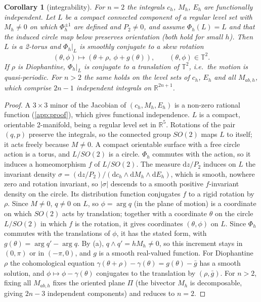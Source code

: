 \documentclass[11pt,a4paper]{article}
\newtheorem{corollary}[theorem]{Corollary}
\theoremstyle{definition}
\theoremstyle{remark}
\newcommand{\R}{\mathbb{R}}
\newcommand{\dd}{\mathrm{d}}
\begin{document}
\begin{corollary}[integrability]\label{cor:tori}
For $n=2$ the integrals $c_h$, $M_h$, $E_h$ are functionally independent. Let $L$ be a compact connected
component of a regular level set with $M_h\ne0$ on which $\Phi_h^{\pm1}$ are defined and $P_2\ne0$, and assume
$\Phi_h(L)=L$ and that the induced circle map below preserves orientation (both hold for small $h$). Then $L$
is a 2-torus and $\Phi_h|_L$ is smoothly conjugate to a skew rotation
\[
(\theta,\phi)\mapsto(\theta+\rho,\ \phi+g(\theta)),\qquad(\theta,\phi)\in\mathbb T^2 .
\]
If $\rho$ is Diophantine, $\Phi_h|_L$ is conjugate to a translation of $\mathbb T^2$, i.e.\ the motion is
quasi-periodic. For $n>2$ the same holds on the level sets of $c_h$, $E_h$ and all $M_{ab,h}$, which comprise
$2n-1$ independent integrals on $\R^{2n+1}$.
\end{corollary}

\begin{proof}
A $3\times3$ minor of the Jacobian of $(c_h,M_h,E_h)$ is a non-zero rational function (\cref{app:proof}), which
gives functional independence. $L$ is a compact, orientable 2-manifold, being a regular level set in $\R^5$.
Rotations of the pair $(q,p)$ preserve the integrals, so the connected group $SO(2)$ maps $L$ to itself; it acts
freely because $M\ne0$. A compact orientable surface with a free circle action is a torus, and $L/SO(2)$ is a
circle. $\Phi_h$ commutes with the action, so it induces a homeomorphism $f$ of $L/SO(2)$. The measure
$\dd z/P_2$ induces on $L$ the invariant density $\sigma=(\dd z/P_2)/(\dd c_h\wedge\dd M_h\wedge\dd E_h)$, which
is smooth, nowhere zero and rotation invariant, so $\lvert\sigma\rvert$ descends to a smooth positive
$f$-invariant density on the circle. Its distribution function conjugates $f$ to a rigid rotation by $\rho$. Since $M\ne0$, $q\ne0$ on $L$, so $\phi=\arg q$ (in the plane of
motion) is a coordinate on which $SO(2)$ acts by translation; together with a coordinate $\theta$ on the circle
$L/SO(2)$ in which $f$ is the rotation, it gives coordinates $(\theta,\phi)$ on $L$. Since $\Phi_h$ commutes with
the translations of $\phi$, it has the stated form, with $g(\theta)=\arg q'-\arg q$. By (a), $q\wedge
q'=hM_h\ne0$, so this increment stays in $(0,\pi)$ or in $(-\pi,0)$, and $g$ is a smooth real-valued function.
For Diophantine $\rho$ the cohomological equation $\gamma(\theta+\rho)-\gamma(\theta)=g(\theta)-\bar g$ has a smooth solution, and
$\phi\mapsto\phi-\gamma(\theta)$ conjugates to the translation by $(\rho,\bar g)$. For $n>2$, fixing all
$M_{ab,h}$ fixes the oriented plane $\Pi$ (the bivector $M_h$ is decomposable, giving $2n-3$ independent
components) and reduces to $n=2$.
\end{proof}
\end{document}
